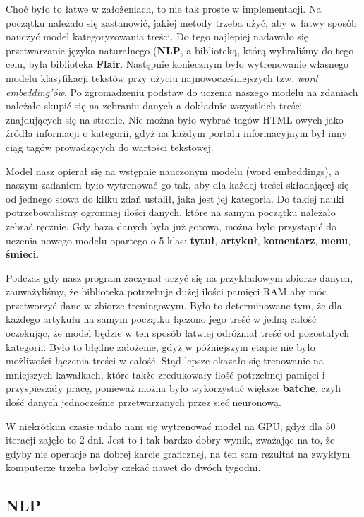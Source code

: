 Choć było to łatwe w założeniach, to nie tak proste w implementacji. Na początku należało się zastanowić, jakiej metody trzeba użyć, aby w łatwy sposób nauczyć model kategoryzowania treści. Do tego najlepiej nadawało się przetwarzanie języka naturalnego (\textbf{NLP}, a biblioteką, którą wybraliśmy do tego celu, była biblioteka \textbf{Flair}. Następnie koniecznym było wytrenowanie własnego modelu klasyfikacji tekstów przy użyciu najnowocześniejszych tzw. \emph{word embedding’ów}. Po zgromadzeniu podstaw do uczenia naszego modelu na zdaniach należało skupić się na zebraniu danych a dokładnie wszystkich treści znajdujących się na stronie. Nie można było wybrać tagów HTML-owych jako źródła informacji o kategorii, gdyż na każdym portalu informacyjnym był inny ciąg tagów prowadzących do wartości tekstowej.

Model nasz opierał się na wstępnie nauczonym modelu (word embeddings), a naszym zadaniem było wytrenować go tak, aby dla każdej treści składającej się od jednego słowa do kilku zdań ustalił, jaka jest jej kategoria. Do takiej nauki potrzebowaliśmy ogromnej ilości danych, które na samym początku należało zebrać ręcznie. Gdy baza danych była już gotowa, można było przystąpić do uczenia nowego modelu opartego o 5 klas: \textbf{tytuł}, \textbf{artykuł}, \textbf{komentarz}, \textbf{menu}, \textbf{śmieci}.

Podczas gdy nasz program zaczynał uczyć się na przykładowym zbiorze danych, zauważyliśmy, że biblioteka potrzebuje dużej ilości pamięci RAM aby móc przetworzyć dane w zbiorze treningowym. Było to determinowane tym, że dla każdego artykułu na samym początku łączono jego treść w jedną całość oczekując, że model będzie w ten sposób łatwiej odróżniał treść od pozostałych kategorii. Było to błędne założenie, gdyż w późniejszym etapie nie było możliwości łączenia treści w całość. Stąd lepsze okazało się trenowanie na mniejszych kawałkach, które także zredukowały ilość potrzebnej pamięci i przyspieszały pracę, ponieważ można było wykorzystać większe \textbf{batche}, czyli ilość danych jednocześnie przetwarzanych przez sieć neuronową.

W niekrótkim czasie udało nam się wytrenować model na GPU, gdyż dla 50 iteracji zajęło to 2 dni. Jest to i tak bardzo dobry wynik, zważając na to, że gdyby nie operacje na dobrej karcie graficznej, na ten sam rezultat na zwykłym komputerze trzeba byłoby czekać nawet do dwóch tygodni.



\subsection{NLP}
\label{sec:3.2.1}

